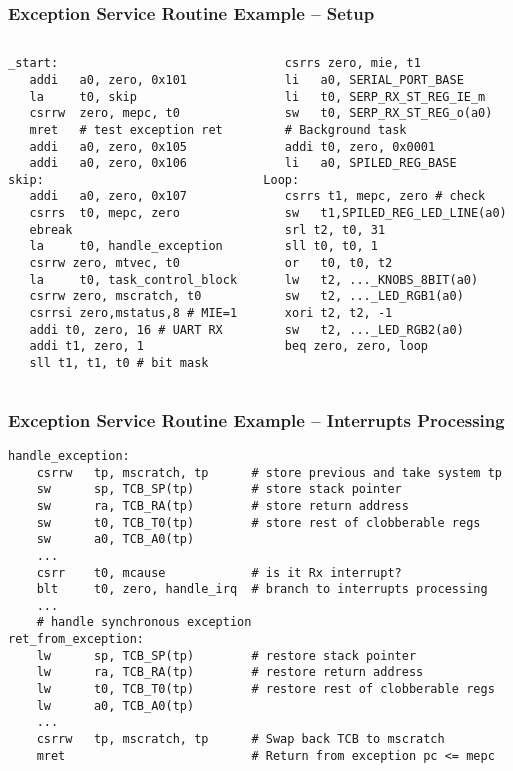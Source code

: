\documentclass{beamer}
\begin{document}
\begin{frame}[fragile]
\frametitle{Exception Service Routine Example – Setup}

\begin{columns}
\begin{column}{0.5\textwidth}
\begin{verbatim}
_start:
   addi   a0, zero, 0x101
   la     t0, skip
   csrrw  zero, mepc, t0
   mret   # test exception ret
   addi   a0, zero, 0x105
   addi   a0, zero, 0x106
skip:
   addi   a0, zero, 0x107
   csrrs  t0, mepc, zero
   ebreak
   la     t0, handle_exception
   csrrw zero, mtvec, t0
   la     t0, task_control_block
   csrrw zero, mscratch, t0
   csrrsi zero,mstatus,8 # MIE=1
   addi t0, zero, 16 # UART RX
   addi t1, zero, 1
   sll t1, t1, t0 # bit mask
\end{verbatim}
\end{column}
\begin{column}{0.5\textwidth}
\begin{verbatim}
   csrrs zero, mie, t1
   li   a0, SERIAL_PORT_BASE
   li   t0, SERP_RX_ST_REG_IE_m
   sw   t0, SERP_RX_ST_REG_o(a0)
   # Background task
   addi t0, zero, 0x0001
   li   a0, SPILED_REG_BASE
Loop:
   csrrs t1, mepc, zero # check
   sw   t1,SPILED_REG_LED_LINE(a0)
   srl t2, t0, 31
   sll t0, t0, 1
   or   t0, t0, t2
   lw   t2, ..._KNOBS_8BIT(a0)
   sw   t2, ..._LED_RGB1(a0)
   xori t2, t2, -1
   sw   t2, ..._LED_RGB2(a0)
   beq zero, zero, loop
\end{verbatim}
\end{column}
\end{columns}

\end{frame}

\begin{frame}[fragile]
\frametitle{Exception Service Routine Example -- Interrupts Processing}

\begin{verbatim}
handle_exception:
    csrrw   tp, mscratch, tp      # store previous and take system tp
    sw      sp, TCB_SP(tp)        # store stack pointer
    sw      ra, TCB_RA(tp)        # store return address
    sw      t0, TCB_T0(tp)        # store rest of clobberable regs
    sw      a0, TCB_A0(tp)
    ...
    csrr    t0, mcause            # is it Rx interrupt?
    blt     t0, zero, handle_irq  # branch to interrupts processing
    ...
    # handle synchronous exception
ret_from_exception:
    lw      sp, TCB_SP(tp)        # restore stack pointer
    lw      ra, TCB_RA(tp)        # restore return address
    lw      t0, TCB_T0(tp)        # restore rest of clobberable regs
    lw      a0, TCB_A0(tp)
    ...
    csrrw   tp, mscratch, tp      # Swap back TCB to mscratch
    mret                          # Return from exception pc <= mepc
\end{verbatim}
\end{frame}
\end{document}
